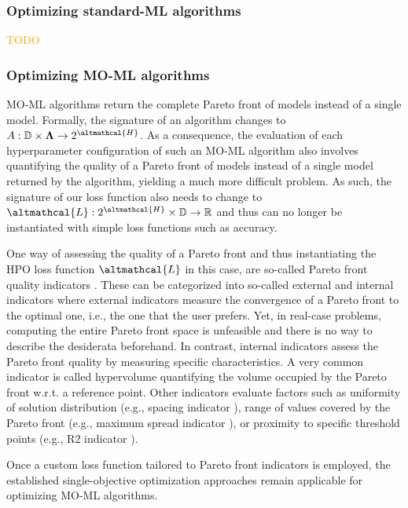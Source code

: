 \subsubsection{Optimizing standard-ML algorithms}

\textcolor{orange}{TODO}

\subsubsection{Optimizing MO-ML algorithms}

MO-ML algorithms return the complete Pareto front of models instead of a single model.
Formally, the signature of an algorithm changes to $A: \mathbb{D} \times \vec{\Lambda} \rightarrow 2^{\altmathcal{H}}$. As a consequence, the evaluation of each hyperparameter configuration of such an MO-ML algorithm also involves quantifying the quality of a Pareto front of models instead of a single model returned by the algorithm, yielding a much more difficult problem.
As such, the signature of our loss function also needs to change to $\altmathcal{L}: 2^{\altmathcal{H}} \times \mathbb{D} \rightarrow \mathbb{R}$ and thus can no longer be instantiated with simple loss functions such as accuracy.

One way of assessing the quality of a Pareto front and thus instantiating the HPO loss function $\altmathcal{L}$ in this case, are so-called Pareto front quality indicators \cite{audet-ejor21}.
These can be categorized into so-called external and internal indicators where external indicators measure the convergence of a Pareto front to the optimal one, i.e., the one that the user prefers.
Yet, in real-case problems, computing the entire Pareto front space is unfeasible and there is no way to describe the desiderata beforehand.
In contrast, internal indicators assess the Pareto front quality by measuring specific characteristics.
A very common indicator is called hypervolume \cite{zitzler1999multiobjective} quantifying the volume occupied by the Pareto front w.r.t. a reference point.
Other indicators evaluate factors such as uniformity of solution distribution (e.g., spacing indicator \cite{schott1995fault}), range of values covered by the Pareto front (e.g., maximum spread indicator \cite{zitzler2000comparison}), or proximity to specific threshold points (e.g., R2 indicator \cite{hansen1994evaluating}).

Once a custom loss function tailored to Pareto front indicators is employed, the established single-objective optimization approaches remain applicable for optimizing MO-ML algorithms.


